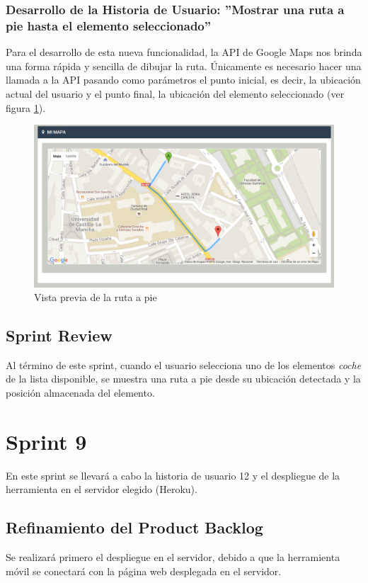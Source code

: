	\subsubsection{Desarrollo de la Historia de Usuario: ''Mostrar una ruta a pie hasta el elemento seleccionado''}
	Para el desarrollo de esta nueva funcionalidad, la API de Google Maps nos brinda una forma rápida y sencilla de dibujar la ruta. Únicamente es necesario hacer una llamada a la API pasando como parámetros el punto inicial, es decir, la ubicación actual del usuario y el punto final, la ubicación del elemento seleccionado (ver figura \ref{fig:ruta}).
	
	\begin{figure}[H]
		\centering
		\includegraphics[width=15cm, fbox={\fboxrule} 4mm]{images/05-resultados/24-ruta.png}
		\caption{Vista previa de la ruta a pie}
		\label{fig:ruta}
	\end{figure}
			
	\subsection{Sprint Review}
	Al término de este sprint, cuando el usuario selecciona uno de los elementos \textit{coche} de la lista disponible, se muestra una ruta a pie desde su ubicación detectada y la posición almacenada del elemento.
	
\section{Sprint 9}
En este sprint se llevará a cabo la historia de usuario 12 y el despliegue de la herramienta en el servidor elegido (Heroku).

	\subsection{Refinamiento del Product Backlog}
	Se realizará primero el despliegue en el servidor, debido a que la herramienta móvil se conectará con la página web desplegada en el servidor.

